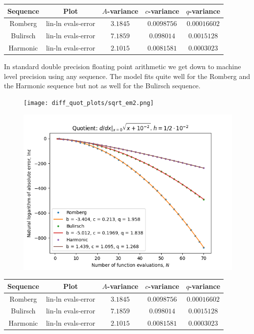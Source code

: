 \begin{table}[H]
    \centering
    \begin{tabular}{c|c||c|c|c}
Sequence & Plot & \(A\)-variance & \(c\)-variance & \(q\)-variance\\\hline
Romberg & lin-ln evals-error & \(3.1845\) & \(0.0098756\) & \(0.00016602\) \\
Bulirsch & lin-ln evals-error & \(7.1859\) & \(0.098014\) & \(0.0015128\) \\
Harmonic & lin-ln evals-error & \(2.1015\) & \(0.0081581\) & \(0.0003023\) \\
    \end{tabular}
    \label{tab:my_label}
\end{table}

In standard double precision floating point arithmetic we get down to machine level precision using any sequence. The model fits quite well for the Romberg and the Harmonic sequence but not as well for the Bulirsch sequence.

\begin{figure}[H]
\centering
\begin{minipage}{0.45\textwidth}
\centering
\texttt{[image: diff\_quot\_plots/sqrt\_em2.png]}
\end{minipage}
\begin{minipage}{0.45\textwidth}
\centering
\includegraphics[scale=0.45]{diff_quot_plots/sqrt_em2_hp_trend.png}
\end{minipage}
\end{figure}

\begin{table}[H]
    \centering
    \begin{tabular}{c|c||c|c|c}
Sequence & Plot & \(A\)-variance & \(c\)-variance & \(q\)-variance\\\hline
Romberg & lin-ln evals-error & \(3.1845\) & \(0.0098756\) & \(0.00016602\) \\
Bulirsch & lin-ln evals-error & \(7.1859\) & \(0.098014\) & \(0.0015128\) \\
Harmonic & lin-ln evals-error & \(2.1015\) & \(0.0081581\) & \(0.0003023\) \\
    \end{tabular}
    \label{tab:my_label}
\end{table}

